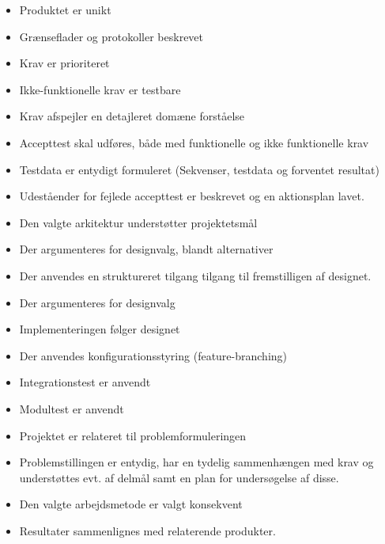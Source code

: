 \begin{itemize}
  \item Produktet er unikt
  \item Grænseflader og protokoller beskrevet
  \item Krav er prioriteret
  \item Ikke-funktionelle krav er testbare
  \item Krav afspejler en detajleret domæne forståelse
  \item Accepttest skal udføres, både med funktionelle og ikke funktionelle krav
  \item Testdata er entydigt formuleret (Sekvenser, testdata og forventet resultat)
  \item Udeståender for fejlede accepttest er beskrevet og en aktionsplan lavet.
  \item Den valgte arkitektur understøtter projektetsmål
  \item Der argumenteres for designvalg, blandt alternativer
  \item Der anvendes en struktureret tilgang tilgang til fremstilligen af designet.
  \item Der argumenteres for designvalg
  \item Implementeringen følger designet
  \item Der anvendes konfigurationsstyring (feature-branching)
  \item Integrationstest er anvendt
  \item Modultest er anvendt
  \item Projektet er relateret til problemformuleringen
  \item Problemstillingen er entydig, har en tydelig sammenhængen med krav og understøttes evt. af delmål samt en plan for undersøgelse af disse.
  \item Den valgte arbejdsmetode er valgt konsekvent
  \item Resultater sammenlignes med relaterende produkter.
\end{itemize}

